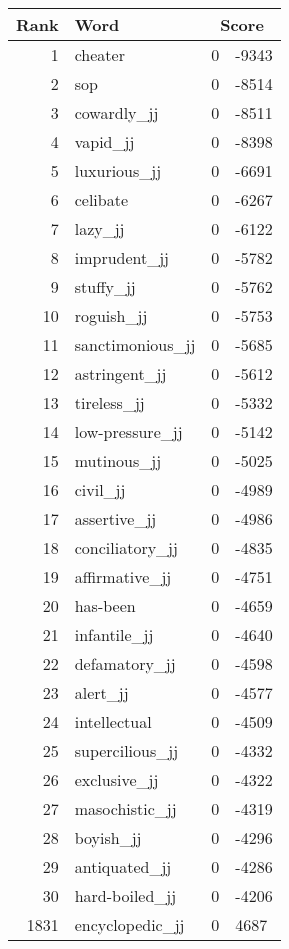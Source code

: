 \begin{longtable}[!htbp]{| rlr@{.}l |}
    \hline
    \textbf{Rank} & \textbf{Word} & \multicolumn{2}{c|}{\textbf{Score}} \\
    \hline
    \endhead
    1 & cheater & 0 & -9343 \\
    2 & sop & 0 & -8514 \\
    3 & cowardly\_jj & 0 & -8511 \\
    4 & vapid\_jj & 0 & -8398 \\
    5 & luxurious\_jj & 0 & -6691 \\
    6 & celibate & 0 & -6267 \\
    7 & lazy\_jj & 0 & -6122 \\
    8 & imprudent\_jj & 0 & -5782 \\
    9 & stuffy\_jj & 0 & -5762 \\
    10 & roguish\_jj & 0 & -5753 \\
    11 & sanctimonious\_jj & 0 & -5685 \\
    12 & astringent\_jj & 0 & -5612 \\
    13 & tireless\_jj & 0 & -5332 \\
    14 & low-pressure\_jj & 0 & -5142 \\
    15 & mutinous\_jj & 0 & -5025 \\
    16 & civil\_jj & 0 & -4989 \\
    17 & assertive\_jj & 0 & -4986 \\
    18 & conciliatory\_jj & 0 & -4835 \\
    19 & affirmative\_jj & 0 & -4751 \\
    20 & has-been & 0 & -4659 \\
    21 & infantile\_jj & 0 & -4640 \\
    22 & defamatory\_jj & 0 & -4598 \\
    23 & alert\_jj & 0 & -4577 \\
    24 & intellectual & 0 & -4509 \\
    25 & supercilious\_jj & 0 & -4332 \\
    26 & exclusive\_jj & 0 & -4322 \\
    27 & masochistic\_jj & 0 & -4319 \\
    28 & boyish\_jj & 0 & -4296 \\
    29 & antiquated\_jj & 0 & -4286 \\
    30 & hard-boiled\_jj & 0 & -4206 \\
    1831 & encyclopedic\_jj & 0 & 4687 \\

\end{longtable}
